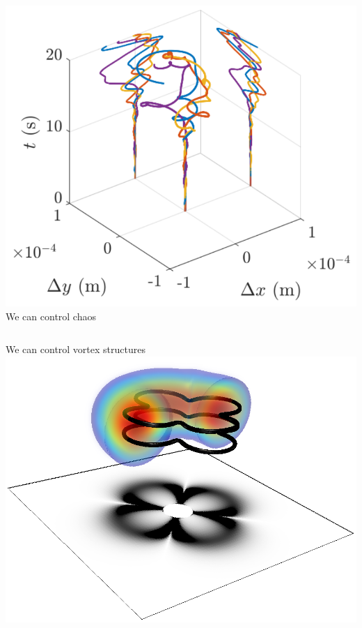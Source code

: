 \documentclass{beamer}
\begin{document}
\begin{frame}
\begin{columns}
\includegraphics[width=\textwidth]{../data/2d/evolution/evolution}
We can control chaos
\end{columns}

\begin{columns}
We can control vortex structures
\includegraphics[width=\textwidth]{../data/3d/HE21_3d}
\end{columns}

\end{frame}
\end{document}
